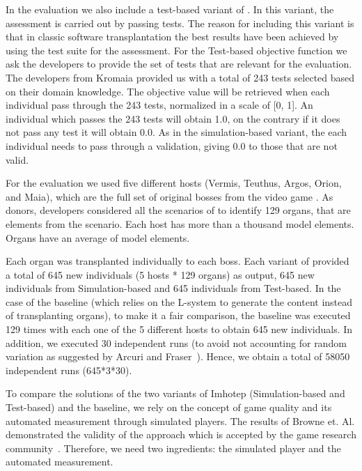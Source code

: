 In the evaluation we also include a test-based variant of \ApproachName{}. In this variant, the assessment is carried out by passing tests. The reason for including this variant is that in classic software transplantation the best results have been achieved by using the test suite for the assessment.
For the Test-based objective function we ask the developers to provide the set of tests that are relevant for the evaluation. The developers from Kromaia provided us with a total of 243 tests selected based on their domain knowledge. The objective value will be retrieved when each individual pass through the 243 tests, normalized in a scale of [0, 1]. An individual which passes the 243 tests will obtain 1.0, on the
contrary if it does not pass any test it will obtain 0.0. As in the simulation-based variant, the each individual needs to pass through a validation, giving 0.0 to those that are not valid.

For the evaluation we used five different hosts (Vermis, Teuthus, Argos, Orion, and Maia), which are the full set of original bosses from the video game \CaseStudy{}. As donors, \CaseStudy{} developers considered all the \CaseStudy{} scenarios of to identify 129 organs, that are elements from the scenario. Each host has more than a thousand model elements. Organs have an average of  model elements.

Each organ was transplanted individually to each boss. Each variant of \ApproachName{} provided a total of 645 new individuals (5 hosts * 129 organs) as output, 645 new individuals from Simulation-based and 645 individuals from Test-based. In the case of the baseline (which relies on the L-system to generate the content instead of transplanting organs), to make it a fair comparison, the baseline was executed 129 times with each one of the 5 different hosts to obtain 645 new individuals. In addition, we executed 30 independent runs (to avoid not accounting for random variation as suggested by Arcuri and Fraser~\cite{arcuri2013parameter}). Hence, we obtain a total of 58050 independent runs (645*3*30).

To compare the solutions of the two variants of Imhotep (Simulation-based and Test-based) and the baseline, we rely on the concept of game quality and its automated measurement through simulated players. The results of Browne et. Al. demonstrated the validity of the approach which is accepted by the game research community~\cite{browne2010evolutionary}. Therefore, we need two ingredients: the simulated player and the automated measurement.

